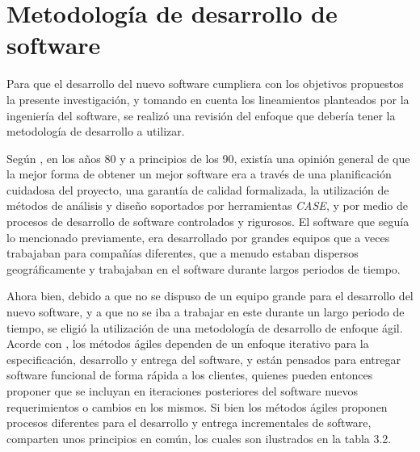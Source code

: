 	\section{Metodolog\'{i}a de desarrollo de software}
Para que el desarrollo del nuevo software cumpliera con los objetivos propuestos la presente investigaci\'{o}n, y tomando en cuenta los lineamientos planteados por la ingenier\'{i}a del software, se realiz\'{o} una revisi\'{o}n del enfoque que deber\'{i}a tener la metodolog\'{i}a de desarrollo a utilizar.

Seg\'{u}n \cite{Sommerville}, en los a\~{n}os 80 y a principios de los 90, exist\'{i}a una opini\'{o}n general de que la mejor forma de obtener un mejor software era a trav\'{e}s de una planificaci\'{o}n cuidadosa del proyecto, una garant\'{i}a de calidad formalizada, la utilizaci\'{o}n de m\'{e}todos de an\'{a}lisis y dise\~{n}o soportados por herramientas \textit{CASE}, y por medio de procesos de desarrollo de software controlados y rigurosos. El software que segu\'{i}a lo mencionado previamente, era desarrollado por grandes equipos que a veces trabajaban para compa\~{n}\'{i}as diferentes, que a menudo estaban dispersos geogr\'{a}ficamente y trabajaban en el software durante largos periodos de tiempo.

Ahora bien, debido a que no se dispuso de un equipo grande para el desarrollo del nuevo software, y a que no se iba a trabajar en este durante un largo periodo de tiempo, se eligi\'{o} la utilizaci\'{o}n de una metodolog\'{i}a de desarrollo de enfoque \'{a}gil. Acorde con \cite{Sommerville}, los m\'{e}todos \'{a}giles dependen de un enfoque iterativo para la especificaci\'{o}n, desarrollo y entrega del software, y est\'{a}n pensados para entregar software funcional de forma r\'{a}pida a los clientes, quienes pueden entonces proponer que se incluyan en iteraciones posteriores del software nuevos requerimientos o cambios en los mismos. Si bien los m\'{e}todos \'{a}giles proponen procesos diferentes para el desarrollo y entrega incrementales de software, comparten unos principios en com\'{u}n, los cuales son ilustrados en la tabla 3.2.

